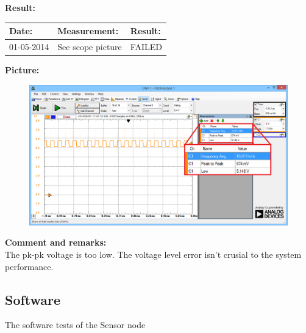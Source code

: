 \textbf{Result:}
\begin{table}[H]
	\centering
	\begin{tabular}{|p{2cm}|p{3cm}|p{2cm}|}\hline
		\textbf{Date:} & \textbf{Measurement:} & \textbf{Result:} \\ \hline
	 	01-05-2014 & See scope picture & FAILED \\ \hline
	\end{tabular}
\end{table}
\textbf{Picture:}
\begin{figure}[H]
\centering
\includegraphics[width=.9\textwidth]{billeder/SN_case_4_osc_picture}
\end{figure}
\textbf{Comment and remarks:}\\
The pk-pk voltage is too low. The voltage level error isn't crusial to the system performance.\\

\subsection{Software}
The software tests of the Sensor node